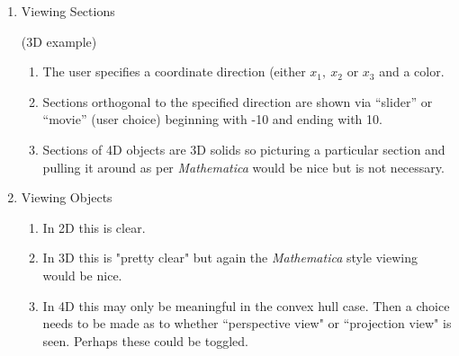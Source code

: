 \documentclass{article}
\begin{document}
\begin{enumerate}[]
\begin{enumerate}[1.]
\end{enumerate}
\item \begin{Large}Viewing Sections\end{Large} (3D example)
\begin{enumerate}[1.]
\item The user specifies a coordinate direction (either $x_1,\ x_2$ or $x_3$ and a color.
\item Sections orthogonal to the specified direction are shown via ``slider'' or ``movie'' 
(user choice) beginning with -10 and ending with 10.
\item Sections of 4D objects are 3D solids so picturing a particular section and pulling it around as per {\it Mathematica} would be nice but is not necessary.
\end{enumerate}
\item \begin{Large}Viewing Objects\end{Large}
\begin{enumerate}[1.]
\item In 2D this is clear.
\item In 3D this is "pretty clear" but again the {\it Mathematica} style viewing would be nice.
\item In 4D this may only be meaningful in the convex hull case. Then a choice needs to be made as to whether ``perspective view" or ``projection view" is seen. Perhaps these could be toggled.
\end{enumerate}

\end{enumerate}
\end{document}
